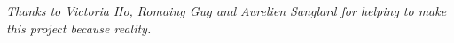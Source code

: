 \clearpage
\thispagestyle{empty}
\vspace*{\fill}
\begin{center}
\begin{minipage}{.6\textwidth}
\emph{Thanks to Victoria Ho, Romaing Guy and Aurelien Sanglard for helping to make this project because reality.\\}
\end{minipage}
\end{center}
\vfill
\clearpage
